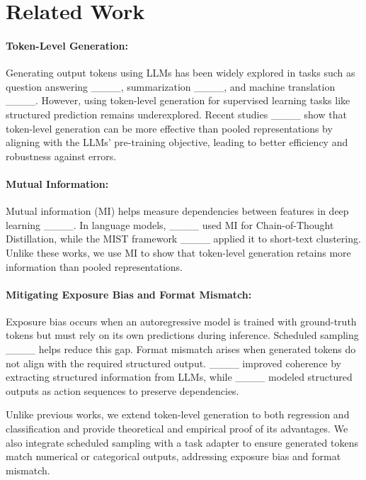 \section{Related Work}
\paragraph{Token-Level Generation:}  
Generating output tokens using LLMs has been widely explored in tasks such as question answering ____, summarization ____, and machine translation ____. However, using token-level generation for supervised learning tasks like structured prediction remains underexplored. Recent studies ____ show that token-level generation can be more effective than pooled representations by aligning with the LLMs' pre-training objective, leading to better efficiency and robustness against errors.

\paragraph{Mutual Information:}  
Mutual information (MI) helps measure dependencies between features in deep learning ____. In language models, ____ used MI for Chain-of-Thought Distillation, while the MIST framework ____ applied it to short-text clustering. Unlike these works, we use MI to show that token-level generation retains more information than pooled representations.

\paragraph{Mitigating Exposure Bias and Format Mismatch:}  
Exposure bias occurs when an autoregressive model is trained with ground-truth tokens but must rely on its own predictions during inference. Scheduled sampling ____ helps reduce this gap. Format mismatch arises when generated tokens do not align with the required structured output. ____ improved coherence by extracting structured information from LLMs, while ____ modeled structured outputs as action sequences to preserve dependencies.


Unlike previous works, we extend token-level generation to both regression and classification and provide theoretical and empirical proof of its advantages. We also integrate scheduled sampling with a task adapter to ensure generated tokens match numerical or categorical outputs, addressing exposure bias and format mismatch.
